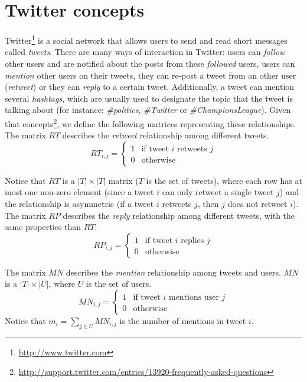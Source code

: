 \section{Twitter concepts}
Twitter\footnote{\url{http://www.twitter.com}} is a social network that allows users to send and read short messages called \emph{tweets}. There are many ways of interaction in Twitter: users can \emph{follow} other users and are notified about the posts from these \emph{followed} users, users can \emph{mention} other users on their tweets, they can re-post a tweet from an other user (\emph{retweet}) or they can \emph{reply} to a certain tweet. Additionally, a tweet can mention several \emph{hashtags}, which are usually used to designate the topic that the tweet is talking about (for instance: \emph{\#politics}, \emph{\#Twitter} or \emph{\#ChampionsLeague}). Given that concepts\footnote{\url{http://support.twitter.com/entries/13920-frequently-asked-questions}}, we define the following matrices representing these relationships. \\

The matrix $RT$ describes the \emph{retweet} relationship among different tweets. 
\begin{equation}\label{eq:retweet_rel}
RT_{i,j} = \begin{cases}
1 & \text{if tweet } i \text{ retweets } j \\
0 & \text{otherwise}
\end{cases}
\end{equation}

Notice that $RT$ is a $|T| \times |T|$ matrix ($T$ is the set of tweets), where each row has at most one non-zero element (since a tweet $i$ can only retweet a single tweet $j$) and the relationship is asymmetric (if a tweet $i$ retweets $j$, then $j$ does not retweet $i$). \\

The matrix $RP$ describes the \emph{reply} relationship among different tweets, with the same properties than $RT$.
\begin{equation}\label{eq:reply_rel}
RP_{i,j} = \begin{cases}
1 & \text{if tweet } i \text{ replies } j \\
0 & \text{otherwise}
\end{cases}
\end{equation}

The matrix $MN$ describes the \emph{mention} relationship among tweets and users. $MN$ is a $|T| \times |U|$, where $U$ is the set of users. 
\begin{equation}\label{eq:mention_rel}
MN_{i,j} = \begin{cases}
1 & \text{if tweet } i \text{ mentions user } j \\
0 & \text{otherwise}
\end{cases}
\end{equation}
Notice that $m_i = \sum_{j \in U} MN_{i,j}$ is the number of mentions in tweet $i$. \\

